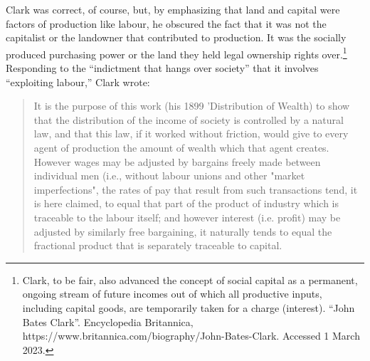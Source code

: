 Clark was correct, of course, but, by emphasizing that land and capital were factors of production like labour, he obscured the fact that it was not the capitalist or the landowner that contributed to production. It was the socially produced purchasing power or the land they held legal ownership rights over.\footnote{Clark, to be fair, also advanced the concept of social capital as a permanent, ongoing stream of future incomes out of which all productive inputs, including capital goods, are temporarily taken for a charge (interest). ``John Bates Clark''. Encyclopedia Britannica, https://www.britannica.com/biography/John-Bates-Clark. Accessed 1 March 2023.}  Responding to the ``indictment that hangs over society'' that it involves ``exploiting labour,'' Clark wrote:
\begin{quotation}
 It is the purpose of this work (his 1899 'Distribution of Wealth) to show that the distribution of the income of society is controlled by a natural law, and that this law, if it worked without friction, would give to every agent of production the amount of wealth which that agent creates. However wages may be adjusted by bargains freely made between individual men (i.e., without labour unions and other "market imperfections", the rates of pay that result from such transactions tend, it is here claimed, to equal that part of the product of industry which is traceable to the labour itself; and however interest (i.e. profit) may be adjusted by similarly free bargaining, it naturally tends to equal the fractional product that is separately traceable to capital. 
\end{quotation}


